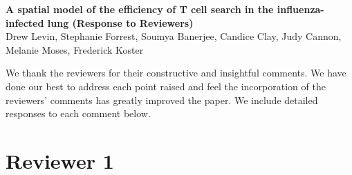 \documentclass[10pt]{article}
\date{}
\begin{document}
\begin{flushleft}
{\Large
\textbf{A spatial model of the efficiency of T cell search in the influenza-infected lung (Response to Reviewers)}
}
\\
Drew Levin, 
Stephanie Forrest, 
Soumya Banerjee,
Candice Clay,
Judy Cannon, 
Melanie Moses, 
Frederick Koster
\end{flushleft}
\vspace{1cm}


We thank the reviewers for their constructive and insightful comments.  We have done our best to address each point raised and feel the incorporation of the reviewers' comments has greatly improved the paper.  We include detailed responses to each comment below.

\section*{Reviewer 1}
\end{document}
